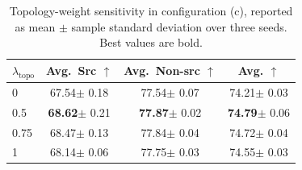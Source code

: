 \begin{table}[H]
    \centering
    \caption{Topology-weight sensitivity in configuration (c), reported as
    mean $\pm$ sample standard deviation over three seeds. Best values are
    bold.}
    \label{tab:sensitivity-15k}
    \small
    \newcommand{\sencell}[2]{#1{\tiny $\pm$ #2}}
    \setlength{\tabcolsep}{9pt}
    \begin{tabular}{@{}lccc@{}}
        \toprule
        $\lambda_{\mathrm{topo}}$ & Avg.~Src $\uparrow$ & Avg.~Non-src $\uparrow$ & Avg. $\uparrow$ \\
        \midrule
        0    & \sencell{67.54}{0.18} & \sencell{77.54}{0.07} & \sencell{74.21}{0.03} \\
        0.5  & \sencell{\textbf{68.62}}{0.21} & \sencell{\textbf{77.87}}{0.02} & \sencell{\textbf{74.79}}{0.06} \\
        0.75 & \sencell{68.47}{0.13} & \sencell{77.84}{0.04} & \sencell{74.72}{0.04} \\
        1    & \sencell{68.14}{0.06} & \sencell{77.75}{0.03} & \sencell{74.55}{0.03} \\
        \bottomrule
    \end{tabular}
\end{table}
